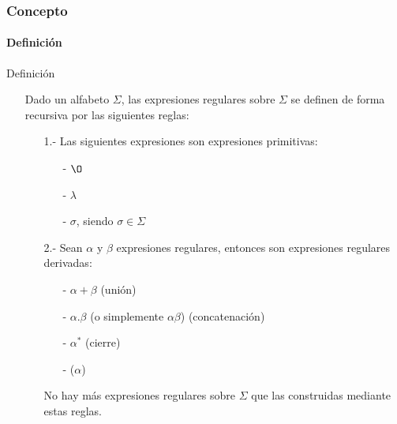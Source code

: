 \documentclass{beamer}
\begin{document}
		\begin{frame}
			\frametitle{Concepto}
			\framesubtitle{Definici\'on}

			\begin{block}{Definici\'on}
			   \begin{itemize}
			       \item[] Dado un alfabeto $\Sigma$, las expresiones regulares sobre $\Sigma$ se definen de forma recursiva por las siguientes reglas:
			       \begin{itemize}
			           \item[1.-] Las siguientes expresiones son expresiones primitivas:
			           \begin{itemize}
			               \item[-] $\O$
			               \item[-] $\lambda$
			               \item[-] $\sigma$, siendo $\sigma \in \Sigma$
			           \end{itemize}
			           \item[2.-] Sean $\alpha$ y $\beta$ expresiones regulares, entonces son expresiones regulares derivadas:
			           \begin{itemize}
			               \item[-] $\alpha + \beta$ (uni\'on)
			               \item[-] $\alpha.\beta$ (o simplemente $\alpha\beta$) (concatenaci\'on)
			               \item[-] $\alpha^{*}$ (cierre)
			               \item[-] ($\alpha$)
			           \end{itemize}
			           \item[] No hay m\'as expresiones regulares sobre $\Sigma$ que las construidas mediante estas reglas.
			       \end{itemize}
			   \end{itemize}
			\end{block}
		\end{frame}
\end{document}
